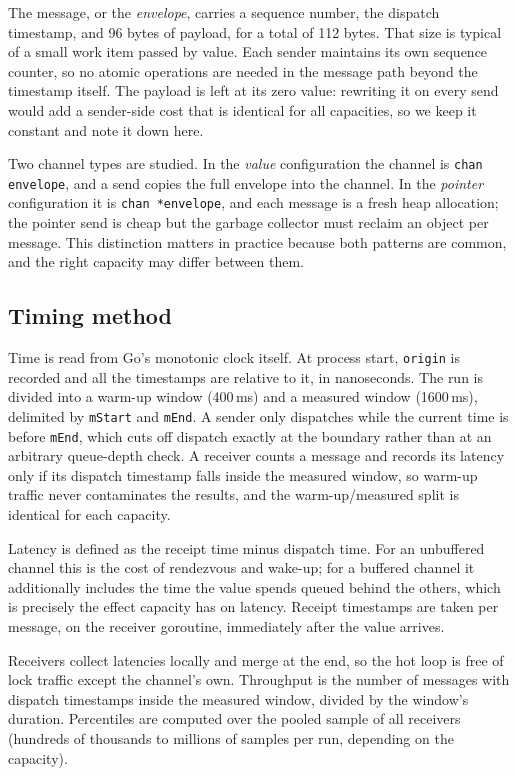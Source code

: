 \documentclass[10pt,a4paper]{article}
\begin{document}
The message, or the \emph{envelope}, carries a sequence number, the dispatch
timestamp, and 96 bytes of payload, for a total of 112 bytes. That size is
typical of a small work item passed by value. Each sender maintains its own
sequence counter, so no atomic operations are needed in the message path beyond
the timestamp itself. The payload is left at its zero value: rewriting it on
every send would add a sender-side cost that is identical for all capacities,
so we keep it constant and note it down here.

Two channel types are studied. In the \emph{value} configuration the channel is
\texttt{chan envelope}, and a send copies the full envelope into the channel.
In the \emph{pointer} configuration it is \texttt{chan *envelope}, and each
message is a fresh heap allocation; the pointer send is cheap but the garbage
collector must reclaim an object per message. This distinction matters in
practice because both patterns are common, and the right capacity may differ
between them.

\subsection{Timing method}
\label{sec:method-timing}

Time is read from Go's monotonic clock itself. At process start, \texttt{origin}
is recorded and all the timestamps are relative to it, in nanoseconds. The run
is divided into a warm-up window (400\,ms) and a measured window (1600\,ms),
delimited by \texttt{mStart} and \texttt{mEnd}. A sender only dispatches while
the current time is before \texttt{mEnd}, which cuts off dispatch exactly at
the boundary rather than at an arbitrary queue-depth check. A receiver counts
a message and records its latency only if its dispatch timestamp falls inside
the measured window, so warm-up traffic never contaminates the results, and the
warm-up/measured split is identical for each capacity.

Latency is defined as the receipt time minus dispatch time. For an unbuffered
channel this is the cost of rendezvous and wake-up; for a buffered channel it
additionally includes the time the value spends queued behind the others, which
is precisely the effect capacity has on latency. Receipt timestamps are taken
per message, on the receiver goroutine, immediately after the value arrives.

Receivers collect latencies locally and merge at the end, so the hot loop is
free of lock traffic except the channel's own. Throughput is the number of
messages with dispatch timestamps inside the measured window, divided by the
window's duration. Percentiles are computed over the pooled sample of all
receivers (hundreds of thousands to millions of samples per run, depending on
the capacity).
\end{document}
